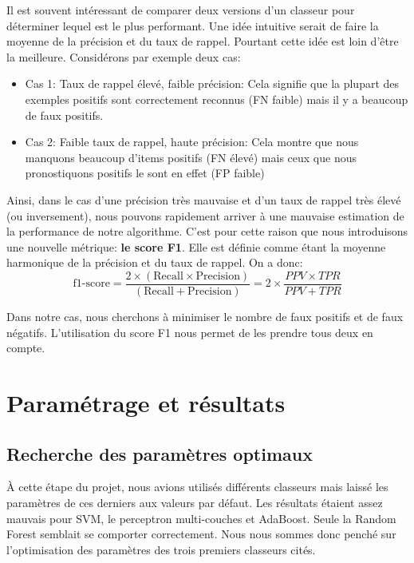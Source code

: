 \documentclass[a4paper]{report}
\begin{document}
Il est souvent intéressant de comparer deux versions d'un classeur pour déterminer lequel est le plus performant. Une idée intuitive serait de faire la moyenne de la précision et du taux de rappel. Pourtant cette idée est loin d'être la meilleure. Considérons par exemple deux cas:
\begin{itemize}

\item Cas 1: Taux de rappel élevé, faible précision: Cela signifie que la plupart des exemples positifs sont correctement reconnus (FN faible) mais il y a beaucoup de faux positifs.

\item Cas 2: Faible taux de rappel, haute précision: Cela montre que nous manquons beaucoup d'items positifs (FN élevé) mais ceux que nous pronostiquons positifs le sont en effet (FP faible)
\end{itemize}

\medskip
Ainsi, dans le cas d'une précision très mauvaise et d'un taux de rappel très élevé (ou inversement), nous pouvons rapidement arriver à une mauvaise estimation de la performance de notre algorithme. C'est pour cette raison que nous introduisons une nouvelle métrique: \textbf{le score F1}. Elle est définie comme étant la moyenne harmonique de la précision et du taux de rappel. On a donc:
\begin{equation}
	\text{f1-score} = \dfrac{2\times(\text{Recall} \times \text{Precision})}{(\text{Recall} + \text{Precision})} = 2\times\dfrac{PPV \times TPR}{PPV + TPR}
\end{equation}

Dans notre cas, nous cherchons à minimiser le nombre de faux positifs et de faux négatifs. L'utilisation du score F1 nous permet de les prendre tous deux en compte.

\chapter{Paramétrage et résultats}

\section{Recherche des paramètres optimaux}

À cette étape du projet, nous avions utilisés différents classeurs mais laissé les paramètres de ces derniers aux valeurs par défaut. Les résultats étaient assez mauvais pour SVM, le perceptron multi-couches et AdaBoost. Seule la Random Forest semblait se comporter correctement. Nous nous sommes donc penché sur l'optimisation des paramètres des trois premiers classeurs cités.
\end{document}

